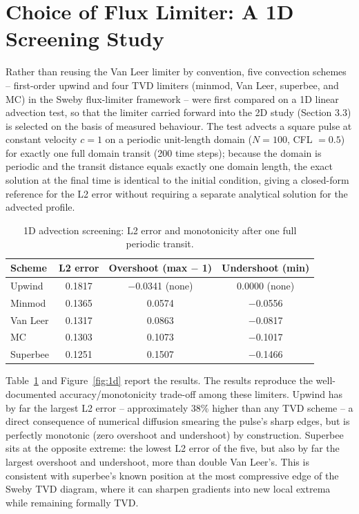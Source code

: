 \documentclass[CHICAGO]{USG}
\begin{document}
\section{Choice of Flux Limiter: A 1D Screening Study}
\label{sec:limiter}

Rather than reusing the Van Leer limiter by convention, five convection schemes -- first-order upwind and four TVD limiters (minmod, Van Leer, superbee, and MC) in the Sweby \citep{sweby1984} flux-limiter framework -- were first compared on a 1D linear advection test, so that the limiter carried forward into the 2D study (Section 3.3) is selected on the basis of measured behaviour. The test advects a square pulse at constant velocity $c=1$ on a periodic unit-length domain ($N=100$, CFL $=0.5$) for exactly one full domain transit (200 time steps); because the domain is periodic and the transit distance equals exactly one domain length, the exact solution at the final time is identical to the initial condition, giving a closed-form reference for the L2 error without requiring a separate analytical solution for the advected profile.

\begin{table}[htbp]
\centering
\caption{1D advection screening: L2 error and monotonicity after one full periodic transit.}
\label{tab:1d}
\begin{tabular}{lccc}
\toprule
Scheme & L2 error & Overshoot (max $-$ 1) & Undershoot (min) \\
\midrule
Upwind    & 0.1817 & $-$0.0341 (none) & 0.0000 (none) \\
Minmod    & 0.1365 & 0.0574  & $-$0.0556 \\
Van Leer  & 0.1317 & 0.0863  & $-$0.0817 \\
MC        & 0.1303 & 0.1073  & $-$0.1017 \\
Superbee  & 0.1251 & 0.1507  & $-$0.1466 \\
\bottomrule
\end{tabular}
\end{table}

Table~\ref{tab:1d} and Figure~\ref{fig:1d} report the results. The results reproduce the well-documented accuracy/monotonicity trade-off among these limiters. Upwind has by far the largest L2 error -- approximately 38\% higher than any TVD scheme -- a direct consequence of numerical diffusion smearing the pulse's sharp edges, but is perfectly monotonic (zero overshoot and undershoot) by construction. Superbee sits at the opposite extreme: the lowest L2 error of the five, but also by far the largest overshoot and undershoot, more than double Van Leer's. This is consistent with superbee's known position at the most compressive edge of the Sweby TVD diagram, where it can sharpen gradients into new local extrema while remaining formally TVD.
\end{document}
